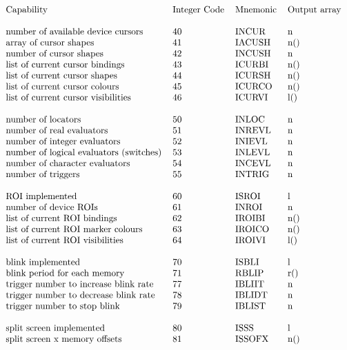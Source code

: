 \[\begin{tabular}{llll}
Capability & Integer Code & Mnemonic & Output array \\
\\
number of available device cursors & 40 & INCUR & n \\
array of cursor shapes & 41 & IACUSH & n() \\
number of cursor shapes & 42 & INCUSH & n \\
list of current cursor bindings & 43 & ICURBI & n() \\
list of current cursor shapes & 44 & ICURSH & n() \\
list of current cursor colours & 45 & ICURCO & n() \\
list of current cursor visibilities & 46 & ICURVI & l() \\
\\
number of locators & 50 & INLOC & n \\
number of real evaluators & 51 & INREVL & n \\
number of integer evaluators & 52 & INIEVL & n \\
number of logical evaluators (switches) & 53 & INLEVL & n \\
number of character evaluators & 54 & INCEVL & n \\
number of triggers & 55 & INTRIG & n \\
\\
ROI implemented & 60 & ISROI & l \\
number of device ROIs & 61 & INROI & n \\
list of current ROI bindings & 62 & IROIBI & n() \\
list of current ROI marker colours & 63 & IROICO & n() \\
list of current ROI visibilities & 64 & IROIVI & l() \\
\\
blink implemented & 70 & ISBLI & l \\
blink period for each memory & 71 & RBLIP & r() \\
trigger number to increase blink rate & 77 & IBLIIT & n \\
trigger number to decrease blink rate & 78 & IBLIDT & n \\
trigger number to stop blink & 79 & IBLIST & n \\
\\
split screen implemented & 80 & ISSS & l \\
split screen x memory offsets & 81 & ISSOFX & n() \\

\end{tabular}\]
